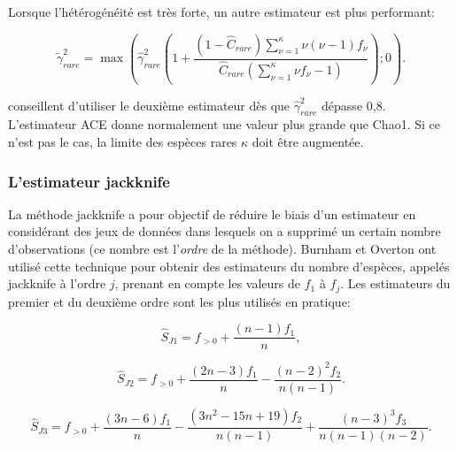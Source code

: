 \documentclass[
  11pt,
  american,
  a4paper,
  extrafontsizes,onecolumn,openright
  ]{memoir}
\newlength{\rf}
\begin{document}
Lorsque l'hétérogénéité est très forte, un autre estimateur est plus performant:

\begin{equation}
  \label{eq:ACEcv2}
  \tilde{\gamma}^{2}_\mathit{rare} 
  = \max\left(
    {\hat{\gamma}}^2_\mathit{rare} \left( 
      1 + \frac{
        \left( 1 - {\hat{C}}_\mathit{rare} \right) \sum^{\kappa}_{\nu = 1}{\nu\left( \nu - 1 \right){f_\nu}}
      }{
        {\hat{C}}_\mathit{rare} \left( \sum^{\kappa}_{\nu = 1}{\nu f_\nu - 1} \right)
      }
    \right) ; 0 
  \right).
\end{equation}

\textcite{Chao2010a} conseillent d'utiliser le deuxième estimateur dès que \({\hat{\gamma}}^2_\mathit{rare}\) dépasse 0,8.
L'estimateur ACE donne normalement une valeur plus grande que Chao1.
Si ce n'est pas le cas, la limite des espèces rares \(\kappa\) doit être augmentée.

\subsubsection{L'estimateur jackknife}\label{lestimateur-jackknife}

La méthode jackknife a pour objectif de réduire le biais d'un estimateur en considérant des jeux de données dans lesquels on a supprimé un certain nombre d'observations (ce nombre est l'\emph{ordre} de la méthode).
Burnham et Overton \autocite*{Burnham1978,Burnham1979} ont utilisé cette technique pour obtenir des estimateurs du nombre d'espèces, appelés jackknife à l'ordre \(j\), prenant en compte les valeurs de \(f_1\) à \(f_j\).
Les estimateurs du premier et du deuxième ordre sont les plus utilisés en pratique:

\begin{equation}
  \label{eq:Jack1}
  \hat{S}_\mathit{J1} = {f_{>0}} + \frac{\left( n - 1 \right) f_1}{n},
\end{equation}

\begin{equation} 
  \label{eq:Jack2}
  \hat{S}_\mathit{J2} 
  = {f_{>0}} + \frac{\left( 2n - 3 \right) f_1}{n} 
    - \frac{{\left( n - 2 \right)}^2 f_2}{n \left( n - 1 \right)}.
\end{equation}

\begin{equation} 
  \label{eq:Jack3}
  \hat{S}_\mathit{J3} 
  = {f_{>0}} + \frac{\left( 3n - 6 \right) f_1}{n} 
    - \frac{\left( 3n^2 - 15n +19 \right) f_2}{n \left( n - 1 \right)}
    + \frac{{\left( n - 3 \right)}^3 f_3}{n \left( n - 1 \right) \left( n - 2 \right)}.
\end{equation}
\end{document}
